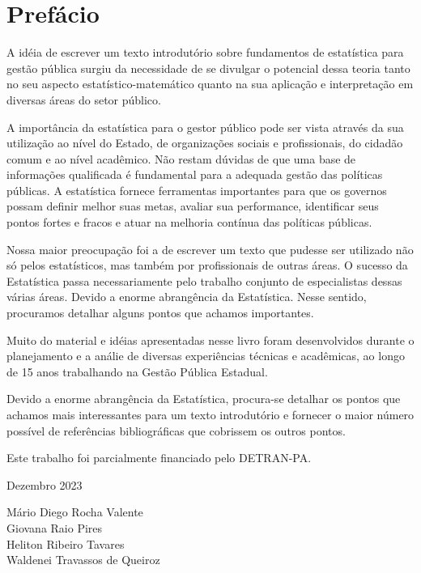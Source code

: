 \chapter*{Prefácio}

\inic A idéia de escrever um texto introdutório sobre fundamentos de estatística para gestão pública surgiu da necessidade de se divulgar o potencial dessa teoria tanto no
seu aspecto estatístico-matemático quanto na sua aplicação e
interpretação em diversas áreas do setor público.\vskip0.3cm



A importância da estatística para o gestor público pode ser vista através da sua
utilização ao nível do Estado, de organizações sociais e profissionais, do cidadão comum e ao nível acadêmico. Não restam dúvidas de que uma base de informações qualificada é fundamental para a adequada gestão das políticas públicas.  A estatística fornece ferramentas importantes para que os governos possam definir melhor suas metas, avaliar sua performance, identificar seus pontos fortes e fracos e atuar na melhoria contínua das políticas públicas.
\vskip0.3cm

Nossa maior preocupação foi a de escrever um texto que pudesse ser
utilizado não só pelos estatísticos, mas também por profissionais de outras áreas. O sucesso da Estatística passa necessariamente
pelo trabalho conjunto de especialistas dessas várias áreas. Devido
a enorme abrangência da Estatística. Nesse sentido, procuramos detalhar
alguns pontos que achamos importantes. \vst

Muito do material e idéias apresentadas nesse livro foram
desenvolvidos durante o planejamento e a análie de diversas experiências técnicas e acadêmicas, ao longo de 15 anos trabalhando na Gestão Pública Estadual.
\vst 

\newpage


Devido a enorme abrangência da Estatística, procura-se detalhar os pontos
que achamos mais interessantes para um texto introdutório e
fornecer o maior número possível de referências bibliográficas que
cobrissem os outros pontos.\vst

Este trabalho foi parcialmente financiado pelo DETRAN-PA.

\vst

\begin{centering}

\vst

Dezembro 2023 
\vsm

Mário Diego Rocha Valente \\
Giovana Raio Pires \\
Heliton Ribeiro Tavares \\
Waldenei Travassos de Queiroz \\



\end{centering}
